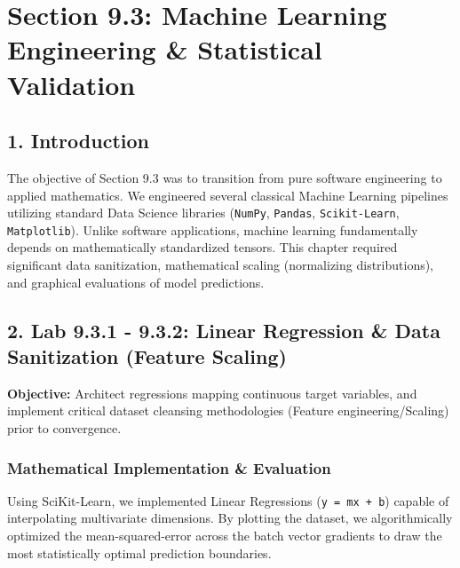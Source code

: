 \hypertarget{section-9.3-machine-learning-engineering-statistical-validation}{%
\section{Section 9.3: Machine Learning Engineering \& Statistical
Validation}\label{section-9.3-machine-learning-engineering-statistical-validation}}

\hypertarget{introduction}{%
\subsection{1. Introduction}\label{introduction}}

The objective of Section 9.3 was to transition from pure software
engineering to applied mathematics. We engineered several classical
Machine Learning pipelines utilizing standard Data Science libraries
(\passthrough{\lstinline!NumPy!}, \passthrough{\lstinline!Pandas!},
\passthrough{\lstinline!Scikit-Learn!},
\passthrough{\lstinline!Matplotlib!}). Unlike software applications,
machine learning fundamentally depends on mathematically standardized
tensors. This chapter required significant data sanitization,
mathematical scaling (normalizing distributions), and graphical
evaluations of model predictions.

\hypertarget{lab-9.3.1---9.3.2-linear-regression-data-sanitization-feature-scaling}{%
\subsection{2. Lab 9.3.1 - 9.3.2: Linear Regression \& Data Sanitization
(Feature
Scaling)}\label{lab-9.3.1---9.3.2-linear-regression-data-sanitization-feature-scaling}}

\textbf{Objective:} Architect regressions mapping continuous target
variables, and implement critical dataset cleansing methodologies
(Feature engineering/Scaling) prior to convergence.

\hypertarget{mathematical-implementation-evaluation}{%
\subsubsection{Mathematical Implementation \&
Evaluation}\label{mathematical-implementation-evaluation}}

Using SciKit-Learn, we implemented Linear Regressions
(\passthrough{\lstinline!y = mx + b!}) capable of interpolating
multivariate dimensions. By plotting the dataset, we algorithmically
optimized the mean-squared-error across the batch vector gradients to
draw the most statistically optimal prediction boundaries.

